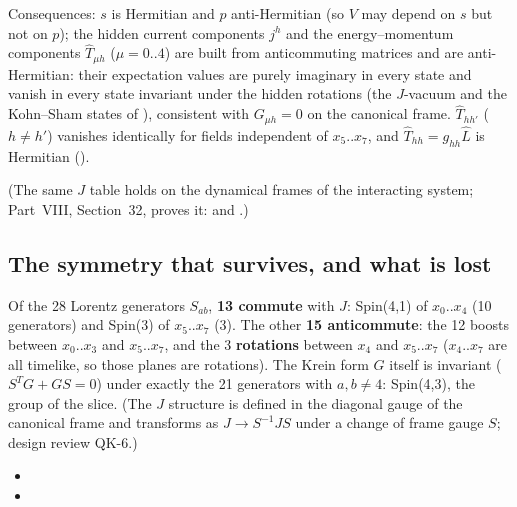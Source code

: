 Consequences: $s$ is Hermitian and $p$ anti-Hermitian (so $V$ may depend on $s$ but not on $p$); the
hidden current components $j^h$ and the energy--momentum components $\hat T_{\mu h}$ ($\mu=0..4$) are
built from anticommuting matrices and are anti-Hermitian: their expectation values are purely
imaginary in every state and vanish in every state invariant under the hidden rotations (the
$J$-vacuum and the Kohn--Sham states of ), consistent with $G_{\mu h}=0$ on the
canonical frame. $\hat T_{hh'}$ ($h\neq h'$) vanishes identically for fields independent of
$x_5..x_7$, and $\hat T_{hh}=g_{hh}\hat L$ is Hermitian ().

(The same $J$ table holds on the dynamical frames of the interacting system; Part~VIII, Section~32,
proves it:  and .)

\subsection{The symmetry that survives, and what is lost}
\label{sec:6.9}

Of the 28 Lorentz generators $S_{ab}$, \textbf{13 commute} with $J$: Spin(4,1) of $x_0..x_4$ (10
generators) and Spin(3) of $x_5..x_7$ (3). The other \textbf{15 anticommute}: the 12 boosts between
$x_0..x_3$ and $x_5..x_7$, and the 3 \textbf{rotations} between $x_4$ and $x_5..x_7$ ($x_4..x_7$ are
all timelike, so those planes are rotations). The Krein form $G$ itself is invariant
($S^{T}G+GS=0$) under exactly the 21 generators with $a,b\neq4$: Spin(4,3), the group of the slice.
 (The $J$ structure is defined in the diagonal gauge of the canonical frame and
transforms as $J\to S^{-1}JS$ under a change of frame gauge $S$; design review QK-6.)
\begin{itemize}
  \item {}
  \item {}
\end{itemize}

